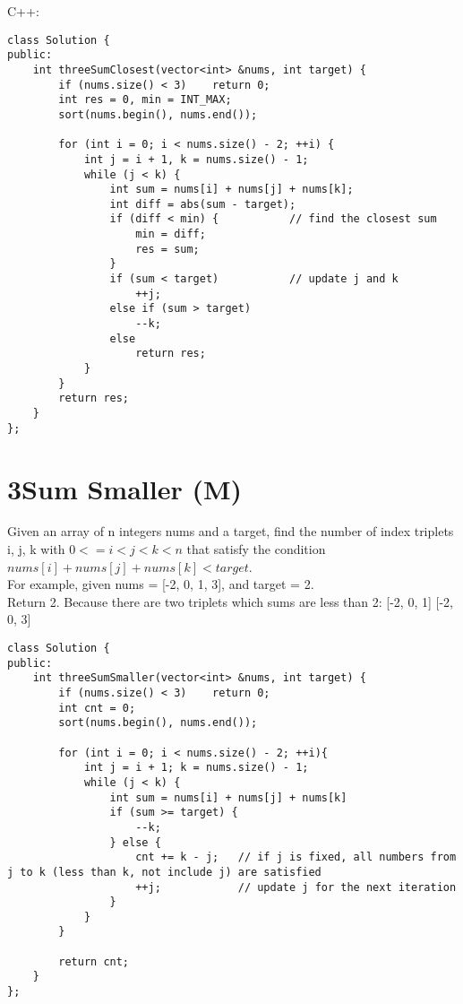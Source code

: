C++:
\lstset{language=C++}
\begin{lstlisting}
class Solution {
public:
    int threeSumClosest(vector<int> &nums, int target) {
        if (nums.size() < 3)    return 0;
        int res = 0, min = INT_MAX;
        sort(nums.begin(), nums.end());
        
        for (int i = 0; i < nums.size() - 2; ++i) {
            int j = i + 1, k = nums.size() - 1;
            while (j < k) {
                int sum = nums[i] + nums[j] + nums[k];
                int diff = abs(sum - target);
                if (diff < min) {           // find the closest sum
                    min = diff;
                    res = sum;
                }
                if (sum < target)           // update j and k
                    ++j;
                else if (sum > target)
                    --k;
                else
                    return res;
            }
        }
        return res;
    }
};
\end{lstlisting}


\section{3Sum Smaller (M)}
Given an array of n integers nums and a target, find the number of index triplets i, j, k with $0 <= i < j < k < n$ that satisfy the condition $nums[i] + nums[j] + nums[k] < target$.\\

For example, given nums = [-2, 0, 1, 3], and target = 2.\\

Return 2. Because there are two triplets which sums are less than 2:
[-2, 0, 1]
[-2, 0, 3]\\

\begin{lstlisting}
class Solution {
public:
    int threeSumSmaller(vector<int> &nums, int target) {
        if (nums.size() < 3)    return 0;
        int cnt = 0;
        sort(nums.begin(), nums.end());
        
        for (int i = 0; i < nums.size() - 2; ++i){
            int j = i + 1; k = nums.size() - 1;
            while (j < k) {
                int sum = nums[i] + nums[j] + nums[k]
                if (sum >= target) {
                    --k;
                } else {
                    cnt += k - j;   // if j is fixed, all numbers from j to k (less than k, not include j) are satisfied
                    ++j;            // update j for the next iteration
                }
            }
        }
        
        return cnt;
    }
};
\end{lstlisting}


